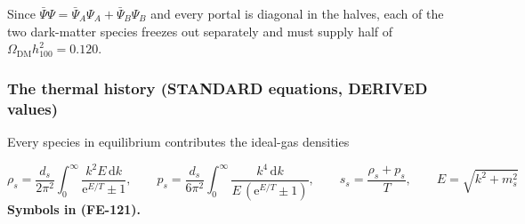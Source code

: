 \documentclass[
  10pt,
]{article}
\begin{document}
Since \(\bar\Psi\Psi = \bar\Psi_A\Psi_A + \bar\Psi_B\Psi_B\) and every
portal is diagonal in the halves, each of the two dark-matter species
freezes out separately and must supply half of
\(\Omega_{\mathrm{DM}}h_{100}^2 = 0.120\).

\hypertarget{the-thermal-history-standard-equations-derived-values}{%
\subsubsection*{The thermal history (STANDARD equations, DERIVED
values)}\label{the-thermal-history-standard-equations-derived-values}}

Every species in equilibrium contributes the ideal-gas densities

\[
\rho_s = \frac{d_s}{2\pi^2}\int_0^\infty\frac{k^2E\,\mathrm{d}k}{\mathrm{e}^{E/T} \pm 1},\qquad
p_s = \frac{d_s}{6\pi^2}\int_0^\infty\frac{k^4\,\mathrm{d}k}{E\,(\mathrm{e}^{E/T} \pm 1)},\qquad
s_s = \frac{\rho_s + p_s}{T},\qquad E = \sqrt{k^2 + m_s^2} \tag{FE-121}
\] \textbf{Symbols in (FE-121).}
\end{document}
